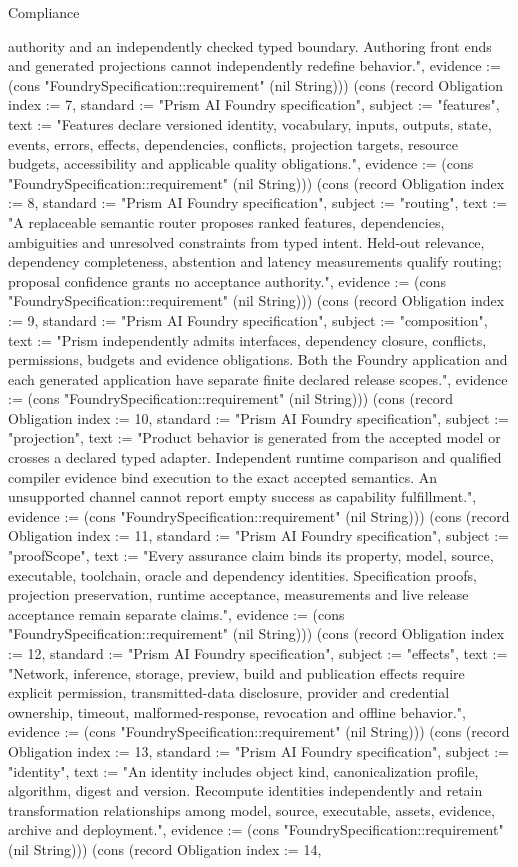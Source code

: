 \begin{lexlean}{Compliance}
\begin{semanticmodule}
{authority and an independently checked typed boundary. Authoring front ends and generated projections cannot independently redefine behavior.", evidence := (cons "FoundrySpecification::requirement" (nil String))}) (cons (record Obligation {index := 7, standard := "Prism AI Foundry specification", subject := "features", text := "Features declare versioned identity, vocabulary, inputs, outputs, state, events, errors, effects, dependencies, conflicts, projection targets, resource budgets, accessibility and applicable quality obligations.", evidence := (cons "FoundrySpecification::requirement" (nil String))}) (cons (record Obligation {index := 8, standard := "Prism AI Foundry specification", subject := "routing", text := "A replaceable semantic router proposes ranked features, dependencies, ambiguities and unresolved constraints from typed intent. Held-out relevance, dependency completeness, abstention and latency measurements qualify routing; proposal confidence grants no acceptance authority.", evidence := (cons "FoundrySpecification::requirement" (nil String))}) (cons (record Obligation {index := 9, standard := "Prism AI Foundry specification", subject := "composition", text := "Prism independently admits interfaces, dependency closure, conflicts, permissions, budgets and evidence obligations. Both the Foundry application and each generated application have separate finite declared release scopes.", evidence := (cons "FoundrySpecification::requirement" (nil String))}) (cons (record Obligation {index := 10, standard := "Prism AI Foundry specification", subject := "projection", text := "Product behavior is generated from the accepted model or crosses a declared typed adapter. Independent runtime comparison and qualified compiler evidence bind execution to the exact accepted semantics. An unsupported channel cannot report empty success as capability fulfillment.", evidence := (cons "FoundrySpecification::requirement" (nil String))}) (cons (record Obligation {index := 11, standard := "Prism AI Foundry specification", subject := "proofScope", text := "Every assurance claim binds its property, model, source, executable, toolchain, oracle and dependency identities. Specification proofs, projection preservation, runtime acceptance, measurements and live release acceptance remain separate claims.", evidence := (cons "FoundrySpecification::requirement" (nil String))}) (cons (record Obligation {index := 12, standard := "Prism AI Foundry specification", subject := "effects", text := "Network, inference, storage, preview, build and publication effects require explicit permission, transmitted-data disclosure, provider and credential ownership, timeout, malformed-response, revocation and offline behavior.", evidence := (cons "FoundrySpecification::requirement" (nil String))}) (cons (record Obligation {index := 13, standard := "Prism AI Foundry specification", subject := "identity", text := "An identity includes object kind, canonicalization profile, algorithm, digest and version. Recompute identities independently and retain transformation relationships among model, source, executable, assets, evidence, archive and deployment.", evidence := (cons "FoundrySpecification::requirement" (nil String))}) (cons (record Obligation {index := 14, }
\end{semanticmodule}
\end{lexlean}
